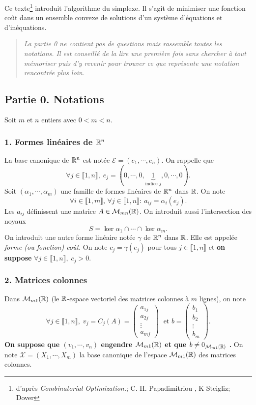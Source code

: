 Ce texte\footnote{d'après \emph{Combinatorial Optimization.}; C. H. Papadimitriou , K Steigliz; Dover} introduit l'algorithme du simplexe. Il s'agit de minimiser une fonction coût dans un ensemble convexe de solutions d'un système d'équations et d'inéquations.
\begin{quote}\textit{
  La partie 0 ne contient pas de questions mais rassemble toutes les notations. Il est conseillé de la lire une première fois sans chercher à tout mémoriser puis d'y revenir pour trouver ce que représente une notation rencontrée plus loin.}
\end{quote}
\subsection*{Partie 0. Notations}
\noindent
Soit $m$ et $n$ entiers avec $0 < m < n$.
\subsubsection*{1. Formes linéaires de $\mathbb{R}^n$}\noindent
La base canonique de $\mathbb{R}^n$ est notée $\mathcal{E} = (e_1,\cdots,e_n)$. On rappelle que
\[
  \forall j \in \llbracket 1,n \rrbracket, \;
  e_j = (0, \cdots, 0, \underset{\text{indice }j}{\underbrace{1}},0, \cdots, 0).
\]
Soit $(\alpha_1, \cdots , \alpha_m)$ une famille de formes linéaires de $\mathbb{R}^n$ dans $\mathbb{R}$. On note
\[
  \forall i \in \llbracket 1, m \rrbracket,\, \forall j \in \llbracket 1, n\rrbracket:\: a_{i j} = \alpha_i(e_j).
\]
Les $a_{i j}$ définissent une matrice $A \in \mathcal{M}_{m n}(\mathbb{R})$. On introduit aussi l'intersection des noyaux
\[
   S = \ker \alpha_1 \cap \cdots \cap \ker \alpha_m .
\]
On introduit une autre forme linéaire notée $\gamma$ de $\mathbb{R}^n$ dans $\mathbb{R}$. Elle est appelée \emph{forme (ou fonction) coût}.\newline
On note $c_j = \gamma(e_j)$ pour tous $j \in \llbracket 1,n \rrbracket$ et \textbf{on suppose} $\forall j \in \llbracket 1,n \rrbracket,\; c_j >0$.

\subsubsection*{2. Matrices colonnes}\noindent
Dans $\mathcal{M}_{m 1}(\mathbb{R})$ (le $\mathbb{R}$-espace vectoriel des matrices colonnes à $m$ lignes), on note
\[
  \forall j \in \llbracket 1, n\rrbracket,\; v_j = C_j(A)
  =
  \begin{pmatrix}
    a_{1 j} \\ a_{2 j} \\ \vdots \\ a_{m j}
  \end{pmatrix}\; \text{ et }
  b=
  \begin{pmatrix}
    b_1 \\ b_2 \\ \vdots\\ b_m
  \end{pmatrix}
.
\]
\textbf{On suppose que $(v_1, \cdots, v_n)$ engendre $\mathcal{M}_{m 1}(\mathbb{R})$ et que $b\neq 0_{\mathcal{M}_{m 1}(\mathbb{R})}$ .}\newline
On note $\mathcal{X} = (X_1, \cdots ,X_m)$ la base canonique de l'espace $\mathcal{M}_{m 1}(\mathbb{R})$ des matrices colonnes.

